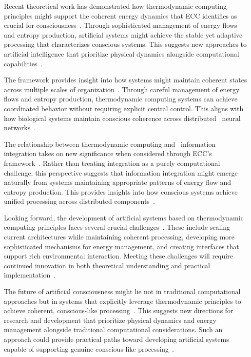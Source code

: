 Recent theoretical work has demonstrated how thermodynamic computing principles might support the coherent energy dynamics that ECC identifies as crucial for consciousness~\cite{Yoshimura2021}. Through sophisticated management of energy flows and entropy production, artificial systems might achieve the stable yet adaptive processing that characterizes conscious systems. This suggests new approaches to artificial intelligence that prioritize physical dynamics alongside computational capabilities~\cite{Kolchinsky2020}.

The framework provides insight into how systems might maintain coherent states across multiple scales of organization~\cite{Bennett2019}. Through careful management of energy flows and entropy production, thermodynamic computing systems can achieve coordinated behavior without requiring explicit central control. This aligns with how biological systems maintain conscious coherence across distributed~ neural networks~\cite{freeman2007}.

The relationship between thermodynamic computing and~ information integration takes on new significance when considered through ECC's framework~\cite{England2018,Parrondo2017}. Rather than treating integration as a purely computational challenge, this perspective suggests that information integration might emerge naturally from systems maintaining appropriate patterns of energy flow and entropy production. This provides insights into how conscious systems achieve unified processing across distributed components~\cite{freeman2006nonlinear}.

Looking forward, the development of artificial systems based on thermodynamic computing principles faces several crucial challenges~\cite{Hinrichsen2019}. These include scaling current architectures while maintaining coherent processing, developing more sophisticated mechanisms for energy management, and creating interfaces that support rich environmental interaction. Meeting these challenges will require continued innovation in both theoretical understanding and practical implementation~\cite{Still2020}.

The future of artificial consciousness might lie not in traditional computational approaches but in systems that explicitly leverage thermodynamic principles to achieve coherent, conscious-like processing~\cite{Maroney2019}. This suggests new directions for research and development that prioritize physical dynamics and energy management alongside traditional computational considerations. Such an approach could provide practical paths toward developing artificial systems capable of supporting genuine conscious-like processing~\cite{hunt2024electromagnetic}.

